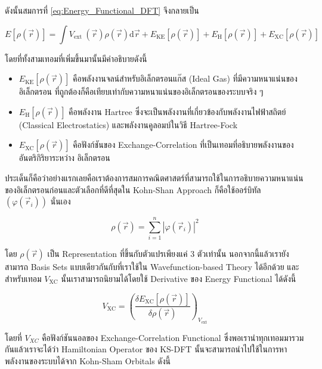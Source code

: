 \noindent ดังนั้นสมการที่ \ref{eq:Energy_Functional_DFT} จึงกลายเป็น 

\begin{equation}
    E[\rho(\vec{r})] 
    = 
    \int V_{\text{ext }}(\vec{r}) \rho(\vec{r}) \mathrm{d} \vec{r} 
        + E_{\text{KE}}[\rho(\vec{r})]
        + E_{\text{H}}[\rho(\vec{r})] 
        + E_{\text{XC}}[\rho(\vec{r})]
\end{equation}

\noindent โดยที่ทั้งสามเทอมที่เพิ่มขึ้นมานั้นมีคำอธิบายดังนี้ 

\begin{itemize}
    \item $E_{\text{KE}}[\rho(\vec{r})]$ คือพลังงานจลน์สำหรับอิเล็กตรอนแก๊ส (Ideal Gas) ที่มีความหนาแน่นของอิเล็กตรอน%
    ที่ถูกต้องก็คือเทียบเท่ากับความหนาแน่นของอิเล็กตรอนของระบบจริง ๆ
    
    \item $E_{\text{H}}[\rho(\vec{r})]$ คือพลังงาน Hartree ซึ่งจะเป็นพลังงานที่เกี่ยวข้องกับพลังงานไฟฟ้าสถิตย์ (Classical 
    Electrostatics) และพลังงานคูลอมบ์ในวิธี Hartree-Fock

    \item $E_{\text{XC}}[\rho(\vec{r})]$ คือฟังก์ชันของ Exchange-Correlation ที่เป็นเทอมที่อธิบายพลังงานของอันตริกิริยาระหว่าง%
    อิเล็กตรอน
\end{itemize}

ประเด็นก็คือว่าอย่างแรกเลยคือเราต้องการสมการคณิตศาสตร์ที่สามารถใช้ในการอธิบายความหนาแน่นของอิเล็กตรอนก่อนและตัวเลือกที่ดีที่สุดใน Kohn-Shan 
Approach ก็คือใช้ออร์บิทัล $(\varphi\left(\vec{r}_i\right))$ นั่นเอง

\begin{equation}
    \label{eq:Electron_Density}
    \rho(\vec{r}) = \sum_{i=1}^n\left|\varphi\left(\vec{r}_i\right)\right|^2
\end{equation}

\noindent โดย $\rho(\vec{r})$ เป็น Representation ที่ขึ้นกับตัวแปรเพียงแค่ 3 ตัวเท่านั้น นอกจากนี้แล้วเรายังสามารถ Basis Sets 
แบบเดียวกันกับที่เราใช้ใน Wavefunction-based Theory ได้อีกด้วย และสำหรับเทอม $V_{\mathrm{XC}}$ นั้นเราสามารถนิยามได้โดยใช้
Derivative ของ Energy Functional ได้ดังนี้ 

\begin{equation}
    V_{\mathrm{XC}} 
    = \left(\frac{\delta E_{\mathrm{XC}}[\rho(\vec{r})]}{\delta \rho(\vec{r})}\right)_{V_{\mathrm{ext}}}
\end{equation}

\noindent โดยที่ $V_{X C}$ คือฟังก์ชันนอลของ Exchange-Correlation Functional ซึ่งพอเรานำทุกเทอมมารวมกันแล้วเราจะได้ว่า 
Hamiltonian Operator ของ KS-DFT นั้นจะสามารถนำไปใช้ในการหาพลังงานของระบบได้จาก Kohn-Sham Orbitals ดังนี้ 

